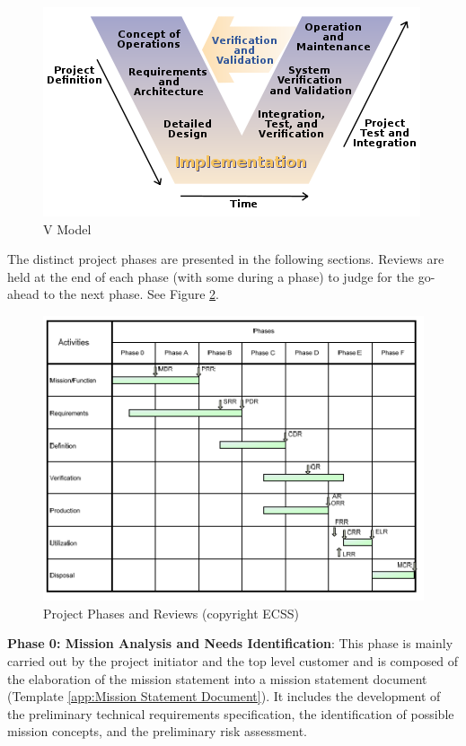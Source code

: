 \begin{figure}[h]
\centering\includegraphics[scale=0.8]{fig/v_model}
\caption{V Model}
\label{fig:V Model}
\end{figure}

The distinct project phases are presented in the following sections. Reviews are held at the end of each phase (with some during a phase) to judge for the go-ahead to the next phase. See Figure \ref{fig:Project Phases and Reviews}.

\begin{figure}[h]
\centering\includegraphics[scale=1.0]{fig/project_phases_and_reviews}
\caption{Project Phases and Reviews (copyright ECSS)}
\label{fig:Project Phases and Reviews}
\end{figure}

\textbf{Phase 0: Mission Analysis and Needs Identification}: This phase is mainly carried out by the project initiator and the top level customer and is composed of the elaboration of the mission statement into a mission statement document (Template \ref{app:Mission Statement Document}). It includes the development of the preliminary technical requirements specification, the identification of possible mission concepts, and the preliminary risk assessment. 

